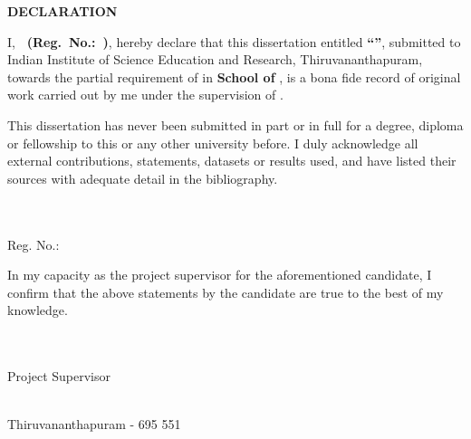 \begin{center}
{\Large{\bf{DECLARATION}}}
\end{center}

\noindent
I, {\bf\ThesisAuthor\ (Reg.\ No.:\ \RegNumber)}, hereby declare that this dissertation entitled {\bf``\ThesisTitle”}, submitted to Indian Institute of Science Education and Research, Thiruvananthapuram, towards the partial requirement of {\bf\DegreeDisplay} in {\bf School of \Department}, is a bona fide record of original work carried out by me under the supervision of {\bf \ProjectSupervisor}. 
\par This dissertation has never been submitted in part or in full for a degree, diploma or fellowship to this or any other university before. I duly acknowledge all external contributions, statements, datasets or results used, and have listed their sources with adequate detail in the bibliography.

\vspace{2.5cm}

\begin{flushright}
    \begin{minipage}[c]{0.4\textwidth}
    \centering
    \fillin[0.9\linewidth]\\
    {\large \bf \ThesisAuthor} \medskip\\
    {\large Reg. No.: \RegNumber}
    \end{minipage}
\end{flushright}
\vspace{0.8cm}
\noindent
In my capacity as the project supervisor for the aforementioned candidate, I confirm that the above statements by the candidate are true to the best of my knowledge.

\vspace{2.5cm}

\begin{flushright}
    \begin{minipage}[c]{0.4\textwidth}
    \centering
    \fillin[0.9\linewidth]\\
    {\large \bf \ProjectSupervisor} \medskip\\
    {\large Project Supervisor}
    \end{minipage}
\end{flushright}
\vfill
\noindent\SubmissionDate \\
Thiruvananthapuram - 695 551
\vspace{1.5cm}
\clearpage
